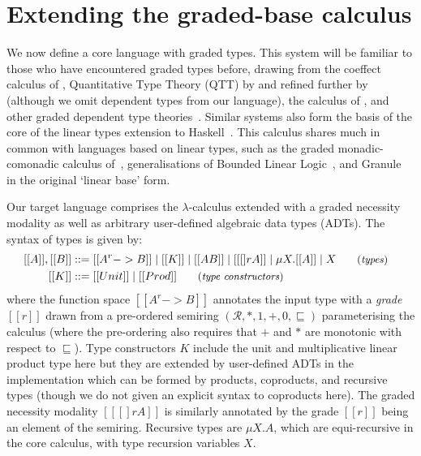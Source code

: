 \section{Extending the graded-base calculus}

We now define a core language with graded types. This system will be familiar to
those who have encountered graded types before, drawing from the coeffect calculus of \citet{petricek2014coeffects}, Quantitative Type Theory (QTT) by \citet{McBride2016} and refined further by \citet{quantitative-type-theory} (although we omit dependent types from our language), the calculus of \citet{DBLP:journals/pacmpl/AbelB20}, and other graded dependent type theories~\cite{quantitative-type-theory,DBLP:conf/esop/MoonEO21}. Similar
systems also form the basis of the core of the linear types extension to Haskell~\cite{DBLP:journals/pacmpl/BernardyBNJS18}.
This calculus shares much in common with languages based on linear types, such
as the graded monadic-comonadic calculus of~\cite{combining2016}, generalisations of Bounded
Linear Logic~\cite{DBLP:conf/esop/BrunelGMZ14,DBLP:conf/esop/GhicaS14}, and Granule~\cite{DBLP:journals/pacmpl/OrchardLE19} in the original `linear base' form.

Our target language comprises the $\lambda$-calculus extended with a graded necessity
modality as well as arbitrary user-defined algebraic data types (ADTs).
The syntax of types is given by:
%
\begin{align*}
\hspace{-0.9em}[[ A ]] , [[ B ]] & ::=
       [[ A ^ r -> B ]]
  \mid [[ K ]]
  \mid [[ A B ]]
  \mid [[ [] r A ]]
  \mid \mu X . [[ A ]]
  \mid X
{\small{\tag{\textit{types}}}}
\\
\hspace{-0.9em}[[ K ]] & ::=
       [[ Unit ]]
  \mid [[ Prod ]]
{\small{\tag{\textit{type constructors}}}}
\end{align*}
%
where the function space $[[ A ^ r -> B ]]$ annotates the input type with a \emph{grade} $[[ r ]]$
drawn from a pre-ordered semiring $(\mathcal{R}, {\ast}, {1}, {+}, {0}, \sqsubseteq)$ parameterising
the calculus (where the pre-ordering also requires that $+$ and $\ast$ are monotonic with respect to $\sqsubseteq$). Type constructors $K$ include the unit and multiplicative linear product type here but they are extended by user-defined ADTs in the implementation which can be formed by products, coproducts, and recursive types (though we do not given an explicit syntax to coproducts here).
The graded necessity modality $[[ [] r A ]]$ is similarly annotated by the grade $[[ r ]]$ being
an element of the semiring. Recursive
types are $\mu X . A$, which are equi-recursive in the core calculus,
with type recursion variables $X$.

